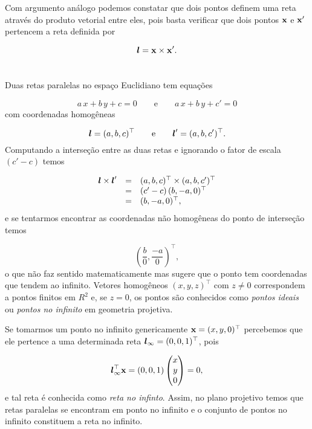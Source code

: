 Com argumento análogo podemos constatar que dois pontos definem uma reta através do produto vetorial entre eles, pois basta verificar que dois pontos $\mathbf{x}$ e $\mathbf{x}'$ pertencem a reta definida por

\begin{equation*}
\boldsymbol{l}=\mathbf{x}\times\mathbf{x}'.
\end{equation*}\\



Duas retas paralelas no espaço Euclidiano tem equações

\begin{equation*}
a\,x+b\,y+c=0\qquad\text{e}\qquad a\,x+b\,y+c'=0
\end{equation*}
com coordenadas homogêneas

\begin{equation*}
\boldsymbol{l}=(a,b,c)^\top\qquad\text{e}\qquad\boldsymbol{l}'=(a,b,c')^\top.
\end{equation*}
Computando a interseção entre as duas retas e ignorando o fator de escala $(c'-c)$ temos

\begin{equation*}
\begin{array}{rcl}
\boldsymbol{l}\times\boldsymbol{l}'&=&(a,b,c)^\top\times(a,b,c')^\top\\
&=&(c'-c)\,(b,-a,0)^\top\\
&=&(b,-a,0)^\top,
\end{array}
\end{equation*}
e se tentarmos encontrar as coordenadas não homogêneas do ponto de interseção temos

\begin{equation*}
\left(\frac{b}{0},\frac{-a}{0}\right)^\top,
\end{equation*}
o que não faz sentido matematicamente mas sugere que o ponto tem coordenadas que tendem ao infinito. Vetores homogêneos $(x,y,z)^\top$ com $z\neq0$ correspondem a pontos finitos em $R^2$ e, se $z=0$, os pontos são conhecidos como \textit{pontos ideais} ou \textit{pontos no infinito} em geometria projetiva.

Se tomarmos um ponto no infinito genericamente $\mathbf{x}=(x,y,0)^\top$ percebemos que ele pertence a uma determinada reta $\boldsymbol{l}_\infty=(0,0,1)^\top$, pois

\begin{equation*}
\boldsymbol{l}_\infty^\top \mathbf{x}=(0,0,1)
\begin{pmatrix}
x\\
y\\
0
\end{pmatrix}
=0,
\end{equation*} 
e tal reta é conhecida como \textit{reta no infinto}. Assim, no plano projetivo temos que retas paralelas se encontram em ponto no infinito e o conjunto de pontos no infinito constituem a reta no infinito.

